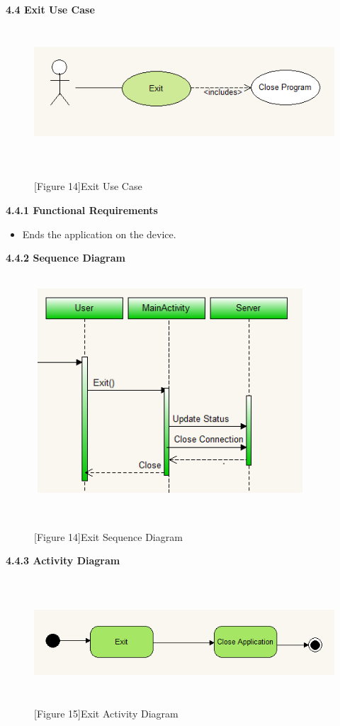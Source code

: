 \documentclass[29pt,a4paper]{moderncv}
\begin{document}
\newpage		
	\left\textbf{4.4 Exit Use Case}
		\begin{figure}
			\centering
			\\ \includegraphics[width=6.0in, height=1.5in]{./exitCase.png}
			\\\caption{[Figure 14]Exit Use Case}\\
		\end{figure}
		
		\textbf{4.4.1 Functional Requirements}
			\begin{itemize}
				\item Ends the application on the device.\\
			\end{itemize}
	
		\left\textbf{4.4.2 Sequence Diagram}
		\begin{figure}
			\centering
			\\ \includegraphics[width=4.0in, height=3.0in]{./exitActivity.png}
			\\\caption{[Figure 14]Exit Sequence Diagram}\\
		\end{figure}

		\left\textbf{4.4.3 Activity Diagram}
				\begin{figure}
					\centering
					\\ \includegraphics[width=5.0in, height=1.5in]{./acExit.png}
					\\\caption{[Figure 15]Exit Activity Diagram}
				\end{figure}
				
\end{document}
